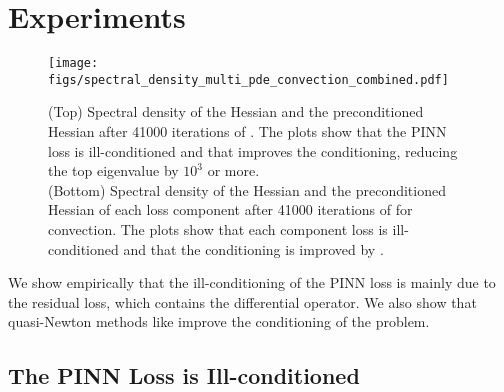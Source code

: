 \section{Experiments}
\label{sec:loss_landscape}

\begin{figure*}[t]
    \centering
    \texttt{[image: figs/spectral\_density\_multi\_pde\_convection\_combined.pdf]}
    \caption{(Top) Spectral density of the Hessian and the preconditioned Hessian after 41000 iterations of \al{}. 
    The plots show that the PINN loss is ill-conditioned and that \lbfgs{} improves the conditioning, reducing the top eigenvalue by $10^3$ or more. \\
    (Bottom) Spectral density of the Hessian and the preconditioned Hessian of each loss component after 41000 iterations of \al{} for convection. The plots show that each component loss is ill-conditioned and that the conditioning is improved by \lbfgs{}.}
    \label{fig:spectral_density_multi_pde_convection_combined}
\end{figure*}

We show empirically that the ill-conditioning of the PINN loss is mainly due to the residual loss, which contains the differential operator.
We also show that quasi-Newton methods like \lbfgs{} improve the conditioning of the problem. 

\subsection{The PINN Loss is Ill-conditioned}


